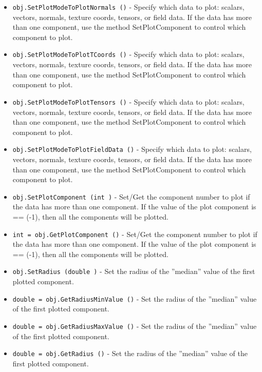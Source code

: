 \begin{itemize}
\item  \verb|obj.SetPlotModeToPlotNormals ()| -  Specify which data to plot: scalars, vectors, normals, texture coords,
 tensors, or field data. If the data has more than one component, use
 the method SetPlotComponent to control which component to plot.

\item  \verb|obj.SetPlotModeToPlotTCoords ()| -  Specify which data to plot: scalars, vectors, normals, texture coords,
 tensors, or field data. If the data has more than one component, use
 the method SetPlotComponent to control which component to plot.

\item  \verb|obj.SetPlotModeToPlotTensors ()| -  Specify which data to plot: scalars, vectors, normals, texture coords,
 tensors, or field data. If the data has more than one component, use
 the method SetPlotComponent to control which component to plot.

\item  \verb|obj.SetPlotModeToPlotFieldData ()| -  Specify which data to plot: scalars, vectors, normals, texture coords,
 tensors, or field data. If the data has more than one component, use
 the method SetPlotComponent to control which component to plot.

\item  \verb|obj.SetPlotComponent (int )| -  Set/Get the component number to plot if the data has more than one 
 component. If the value of the plot component is == (-1), then all
 the components will be plotted.

\item  \verb|int = obj.GetPlotComponent ()| -  Set/Get the component number to plot if the data has more than one 
 component. If the value of the plot component is == (-1), then all
 the components will be plotted.

\item  \verb|obj.SetRadius (double )| -  Set the radius of the ''median'' value of the first plotted component.

\item  \verb|double = obj.GetRadiusMinValue ()| -  Set the radius of the ''median'' value of the first plotted component.

\item  \verb|double = obj.GetRadiusMaxValue ()| -  Set the radius of the ''median'' value of the first plotted component.

\item  \verb|double = obj.GetRadius ()| -  Set the radius of the ''median'' value of the first plotted component.


\end{itemize}
